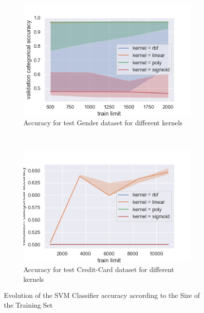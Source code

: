 \documentclass[10pt]{article}
\begin{document}
		\begin{figure}
			\centering
			\begin{subfigure}[]{0.45\columnwidth}
				\centering
				\includegraphics[width=\linewidth]{../graphics/svm_gender_train_limit_score_type_kernel.png}
				\caption{Accuracy for test Gender dataset for different kernels}
				\label{svm:g_train_limit}
			\end{subfigure}
			~
			\begin{subfigure}[]{0.45\columnwidth}
				\centering
				\includegraphics[width=\linewidth]{../graphics/svm_creditcard_train_limit_score_type_kernel.png}
				\caption{Accuracy for test Credit-Card dataset for different kernels}
				\label{svm:cc_train_limit}
			\end{subfigure}
			\caption{Evolution of the SVM Classifier accuracy according to the Size of the Training Set}
			\label{svm:train_limit}
		\end{figure}
\end{document}
